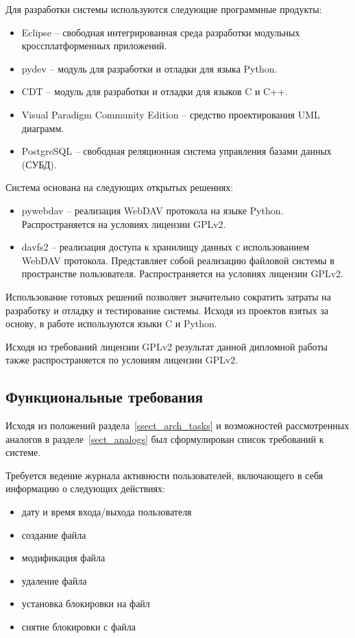 \documentclass[utf8,usehyperref,12pt]{G7-32}
\begin{document}
Для разработки системы используются следующие программные продукты:
\begin{itemize}
 \item Eclipse -- свободная интегрированная среда разработки модульных кроссплатформенных приложений.
 \item pydev -- модуль для разработки и отладки для языка Python.
 \item CDT -- модуль для разработки и отладки для языков C и C++.
 \item Visual Paradigm Community Edition -- средство проектирования UML диаграмм.
 \item PostgreSQL -- свободная реляционная система управления базами данных (СУБД).  
\end{itemize}

Система основана на следующих открытых решениях:
\begin{itemize}
 \item pywebdav -- реализация WebDAV протокола на языке Python. Распространяется на условиях лицензии GPLv2.
 \item davfs2 -- реализация доступа к хранилищу данных с использованием WebDAV протокола. Представляет собой реализацию файловой системы в пространстве пользователя. Распространяется на условиях лицензии GPLv2.
\end{itemize}

Использование готовых решений позволяет значительно сократить затраты на разработку и отладку и тестирование системы. Исходя из проектов взятых за основу, в работе используются языки C и Python. 

Исходя из требований лицензии GPLv2 результат данной дипломной работы также распространяется по условиям лицензии GPLv2.

\subsection{Функциональные требования}\label{ssect_req}

Исходя из положений раздела~\ref{ssect_arch_tasks} и возможностей рассмотренных аналогов в разделе~\ref{sect_analogs} был сформулирован список требований к системе.

Требуется ведение журнала активности пользователей, включающего в себя информацию о следующих действиях: 
\begin{itemize}
\item дату и время входа/выхода пользователя
\item создание файла
\item модификация файла
\item удаление файла
\item установка блокировки на файл
\item снятие блокировки с файла
\end{itemize}
\end{document}
